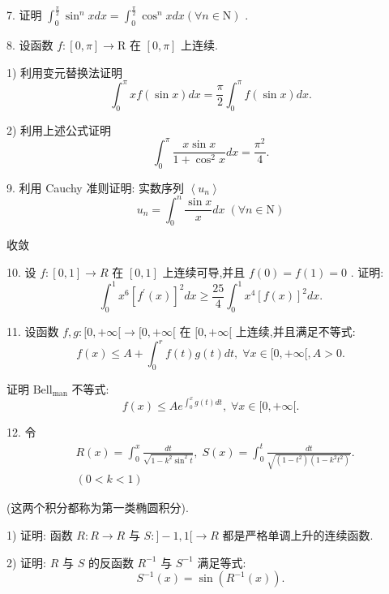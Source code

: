 7. 证明 ${\int }_{0}^{\frac{\pi }{2}}{\sin }^{n}{xdx} = {\int }_{0}^{\frac{\pi }{2}}{\cos }^{n}{xdx}\left( {\forall n \in  \mathrm{N}}\right)$ .

8. 设函数 $f : \left\lbrack  {0,\pi }\right\rbrack   \rightarrow  \mathrm{R}$ 在 $\left\lbrack  {0,\pi }\right\rbrack$ 上连续.

1) 利用变元替换法证明
$${\int }_{0}^{\pi }{xf}\left( {\sin x}\right) {dx} = \frac{\pi }{2}{\int }_{0}^{\pi }f\left( {\sin x}\right) {dx}.$$

2) 利用上述公式证明
$${\int }_{0}^{\pi }\frac{x\sin x}{1 + {\cos }^{2}x}{dx} = \frac{{\pi }^{2}}{4}.$$

9. 利用 Cauchy 准则证明: 实数序列 $\left\langle  {u}_{n}\right\rangle$
$${u}_{n} = {\int }_{0}^{n}\frac{\sin x}{x}{dx}\;\left( {\forall n \in  \mathrm{N}}\right)$$

收敛

10. 设 $f : \left\lbrack  {0,1}\right\rbrack   \rightarrow  R$ 在 $\left\lbrack  {0,1}\right\rbrack$ 上连续可导,并且 $f\left( 0\right)  = f\left( 1\right)  = 0$ . 证明:
$${\int }_{0}^{1}{x}^{6}{\left\lbrack  {f}^{\prime }\left( x\right) \right\rbrack  }^{2}{dx} \geq  \frac{25}{4}{\int }_{0}^{1}{x}^{4}{\left\lbrack  f\left( x\right) \right\rbrack  }^{2}{dx}.$$

11. 设函数 $f,g : \lbrack 0, + \infty \lbrack  \rightarrow  \lbrack 0, + \infty \lbrack$ 在 $\lbrack 0, + \infty \lbrack$ 上连续,并且满足不等式:
$$f\left( x\right)  \leq  A + {\int }_{0}^{r}f\left( t\right) g\left( t\right) {dt},\;\forall x \in  \lbrack 0, + \infty \lbrack ,A > 0.$$

证明 ${\mathrm{{Bell}}}_{\operatorname{man}}$ 不等式:
$$f\left( x\right)  \leq  A{e}^{{\int }_{0}^{x}g\left( t\right) {dt}},\;\forall x \in  \lbrack 0, + \infty \lbrack .$$

12. 令
\begin{align*}
	&R\left( x\right)  = {\int }_{0}^{x}\frac{dt}{\sqrt{1 - {k}^{2}{\sin }^{2}t}},\;S\left( x\right)  = {\int }_{0}^{t}\frac{dt}{\sqrt{\left( {1 - {t}^{2}}\right) \left( {1 - {k}^{2}{t}^{2}}\right) }}.\\
	&\left( {0 < k < 1}\right)
\end{align*}

(这两个积分都称为第一类椭圆积分).

1) 证明: 函数 $R : R \rightarrow  R$ 与 $S : \rbrack  - 1,1\lbrack  \rightarrow  R$ 都是严格单调上升的连续函数.

2) 证明: $R$ 与 $S$ 的反函数 ${R}^{-1}$ 与 ${S}^{-1}$ 满足等式:
$${S}^{-1}\left( x\right)  = \sin \left( {{R}^{-1}\left( x\right) }\right) .$$

